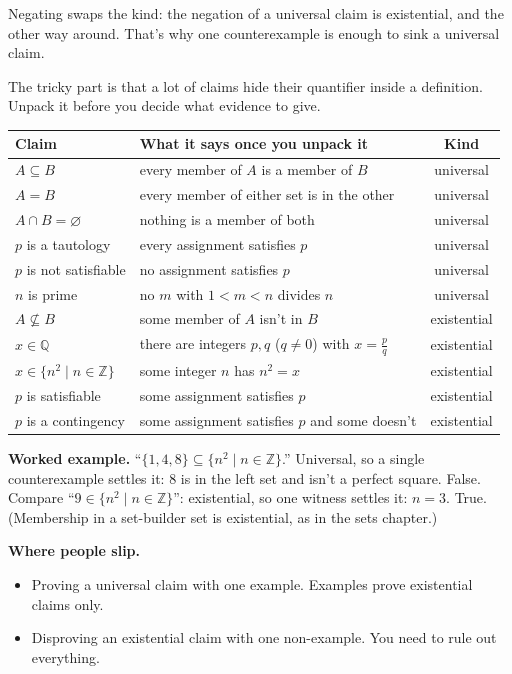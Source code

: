 Negating swaps the kind: the negation of a universal claim is existential, and the other way around. That's why one counterexample is enough to sink a universal claim.

The tricky part is that a lot of claims hide their quantifier inside a definition. Unpack it before you decide what evidence to give.

\begin{center}
\begin{tabularx}{\linewidth}{@{}lLc@{}}
\toprule
\textbf{Claim} & \textbf{What it says once you unpack it} & \textbf{Kind}\\
\midrule
$A\subseteq B$ & every member of $A$ is a member of $B$ & universal\\
$A=B$ & every member of either set is in the other & universal\\
$A\cap B=\varnothing$ & nothing is a member of both & universal\\
$p$ is a tautology & every assignment satisfies $p$ & universal\\
$p$ is not satisfiable & no assignment satisfies $p$ & universal\\
$n$ is prime & no $m$ with $1<m<n$ divides $n$ & universal\\
\midrule
$A\not\subseteq B$ & some member of $A$ isn't in $B$ & existential\\
$x\in\mathbb{Q}$ & there are integers $p,q$ ($q\neq0$) with $x=\frac pq$ & existential\\
$x\in\{n^2\mathrel{|} n\in\mathbb{Z}\}$ & some integer $n$ has $n^2=x$ & existential\\
$p$ is satisfiable & some assignment satisfies $p$ & existential\\
$p$ is a contingency & some assignment satisfies $p$ and some doesn't & existential\\
\bottomrule
\end{tabularx}
\end{center}

\textbf{Worked example.} ``$\{1,4,8\}\subseteq\{n^2\mathrel{|} n\in\mathbb{Z}\}$.'' Universal, so a single counterexample settles it: $8$ is in the left set and isn't a perfect square. False. Compare ``$9\in\{n^2\mathrel{|} n\in\mathbb{Z}\}$'': existential, so one witness settles it: $n=3$. True. (Membership in a set-builder set is existential, as in the sets chapter.)

\textbf{Where people slip.}
\begin{itemize}
  \item Proving a universal claim with one example. Examples prove existential claims only.
  \item Disproving an existential claim with one non-example. You need to rule out everything.
\end{itemize}


